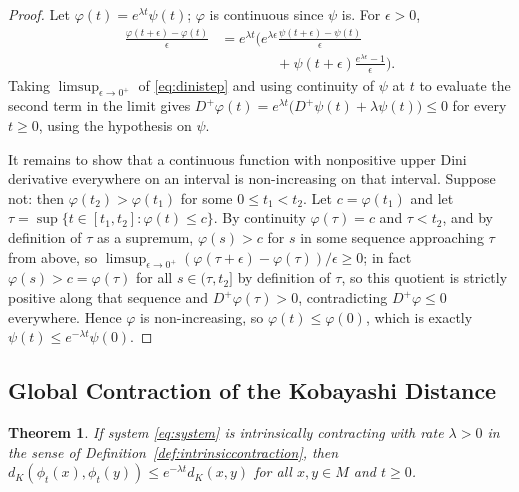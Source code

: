 \documentclass[preprint,12pt,authoryear]{elsarticle}
\newtheorem{theorem}{Theorem}
\newtheorem{proof}{Proof}
\begin{document}
\begin{proof}
Let $\varphi(t)=e^{\lambda t}\psi(t)$; $\varphi$ is continuous since $\psi$ is. For $\epsilon>0$,
\begin{equation}
\label{eq:dinistep}
\begin{aligned}
\frac{\varphi(t+\epsilon)-\varphi(t)}{\epsilon}
&=
e^{\lambda t}\Bigg(
e^{\lambda\epsilon}
\frac{\psi(t+\epsilon)-\psi(t)}{\epsilon}
\\
&\qquad\qquad
+\psi(t+\epsilon)
\frac{e^{\lambda\epsilon}-1}{\epsilon}
\Bigg).
\end{aligned}
\end{equation}
Taking $\limsup_{\epsilon\to0^+}$ of \eqref{eq:dinistep} and using continuity of $\psi$ at $t$ to evaluate the second term in the limit gives $D^+\varphi(t)=e^{\lambda t}\big(D^+\psi(t)+\lambda\psi(t)\big)\le0$ for every $t\ge0$, using the hypothesis on $\psi$.

It remains to show that a continuous function with nonpositive upper Dini derivative everywhere on an interval is non-increasing on that interval. Suppose not: then $\varphi(t_2)>\varphi(t_1)$ for some $0\le t_1<t_2$. Let $c=\varphi(t_1)$ and let $\tau=\sup\{t\in[t_1,t_2]:\varphi(t)\le c\}$. By continuity $\varphi(\tau)=c$ and $\tau<t_2$, and by definition of $\tau$ as a supremum, $\varphi(s)>c$ for $s$ in some sequence approaching $\tau$ from above, so $\limsup_{\epsilon\to0^+}(\varphi(\tau+\epsilon)-\varphi(\tau))/\epsilon\ge0$; in fact $\varphi(s)>c=\varphi(\tau)$ for all $s\in(\tau,t_2]$ by definition of $\tau$, so this quotient is strictly positive along that sequence and $D^+\varphi(\tau)>0$, contradicting $D^+\varphi\le0$ everywhere. Hence $\varphi$ is non-increasing, so $\varphi(t)\le\varphi(0)$, which is exactly $\psi(t)\le e^{-\lambda t}\psi(0)$.
\end{proof}

\subsection{Global Contraction of the Kobayashi Distance}

\begin{theorem}
\label{thm:globalcontraction}
If system \eqref{eq:system} is intrinsically contracting with rate $\lambda>0$ in the sense of Definition~\ref{def:intrinsiccontraction}, then $d_K(\phi_t(x),\phi_t(y))\le e^{-\lambda t}d_K(x,y)$ for all $x,y\in M$ and $t\ge0$.
\end{theorem}
\end{document}
